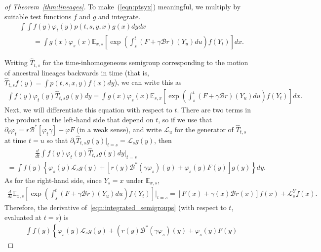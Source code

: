 \documentclass[EJP]{ejpecp} %
\renewcommand{\hat}{\widehat}
\newcommand{\IE}{\mathbb E}
\newcommand{\DG}{\mathcal{B}}  %
\newcommand{\Lgen}{\mathcal{L}}    %
\begin{document}
\begin{proof}[of Theorem~\ref{thm:lineages}]
To make~(\ref{eqn:ptsyx}) meaningful, we multiply by suitable test functions
$f$ and $g$ and integrate.
\begin{align*}
&\int \int f(y) \varphi_t(y) p(t,s,y,x) g(x) dy dx \\
&\qquad =
\int g(x) \varphi_s(x)
\IE_{x,s}\left[
    \exp\left(
        \int_s^t(F+\gamma\DG r)(Y_u)du
    \right)f(Y_t)
\right] dx .
\end{align*}

Writing $\hat{T}_{t,s}$ for the time-inhomogeneous semigroup
corresponding to the motion of ancestral lineages backwards in time
(that is, $\hat{T}_{t,s} f(y) = \int p(t,s,x,y) f(x) dy$),
we can write this as 
\begin{align} \label{eqn:integrated_semigroups}
    \int f(y)\varphi_t(y)\hat{T}_{t,s}g(y)dy
    =
    \int g(x) \varphi_s(x)
        \IE_{s,x} \left[
            \exp\left(
                \int_s^t(F+\gamma\DG r)(Y_u)du
            \right)f(Y_t)
        \right]dx.
\end{align}
Next, we will differentiate this equation with respect to $t$.
There are two terms in the product on the left-hand side that depend on $t$,
so if we
use that $\partial_t \varphi_t = r \DG^*[ \varphi_t \gamma ] + \varphi F$
(in a weak sense),
and write $\Lgen_u$ for the generator of $\hat{T}_{t,s}$ at time $t=u$
so that $\partial_t \hat{T}_{t,s} g(y) \Big|_{t=s} = \Lgen_s g(y)$,
then
\begin{multline*}
    \qquad \qquad
    \frac{d}{dt} 
    \int f(y)\varphi_t(y)\hat{T}_{t,s}g(y)dy
    \Big|_{t=s}
    \\ {}
    =
    \int f(y) \left\{
        \varphi_s(y) \Lgen_s g(y)
        + \left[
            r(y) \DG^*(\gamma \varphi_s)(y) + \varphi_s(y) F(y)
        \right] g(y)
    \right\} dy .
\end{multline*}
As for the right-hand side, since $Y_s=x$ under $\IE_{x,s}$,
\begin{multline*}
    \frac{d}{dt}
        \IE_{x,s}\left[
            \exp\left(
                \int_s^t(F+\gamma\DG r)(Y_u)du
            \right)f(Y_t)
        \right]
    \Bigg|_{t=s}
    =
        \left[F(x)+\gamma(x) \DG r(x)\right] f(x) + \Lgen^Y_s f(x) .
\end{multline*}
Therefore, the derivative of~\eqref{eqn:integrated_semigroups}
(with respect to $t$, evaluated at $t=s$) is
\begin{align*}
&
    \int f(y) \left\{
        \varphi_s(y) \Lgen_s g(y)
        + \left(
            r(y) \DG^*(\gamma \varphi_s)(y) + \varphi_s(y) F(y)

\end{align*}
\end{proof}
\end{document}
